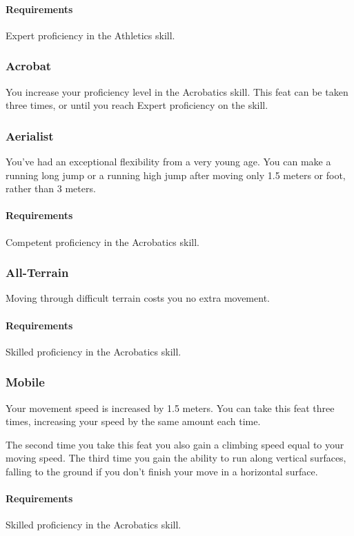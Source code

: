     \paragraph{Requirements} Expert proficiency in the Athletics skill.
\subsubsection{Acrobat} \label{feat::acrobat}
    You increase your proficiency level in the Acrobatics skill.
    This feat can be taken three times, or until you reach Expert proficiency on the skill.
\subsubsection{Aerialist} \label{feat::aerialist}
    You've had an exceptional flexibility from a very young age.
    You can make a running long jump or a running high jump after moving only 1.5 meters or foot, rather than 3 meters.
    \paragraph{Requirements} Competent proficiency in the Acrobatics skill.
\subsubsection{All-Terrain} \label{feat::allterrain}
    Moving through difficult terrain costs you no extra movement.
    \paragraph{Requirements} Skilled proficiency in the Acrobatics skill.
\subsubsection{Mobile} \label{feat::mobile}
    Your movement speed is increased by 1.5 meters.
    You can take this feat three times, increasing your speed by the same amount each time.

    The second time you take this feat you also gain a climbing speed equal to your moving speed.
    The third time you gain the ability to run along vertical surfaces, falling to the ground if you don't finish your move in a horizontal surface.
    \paragraph{Requirements} Skilled proficiency in the Acrobatics skill.
